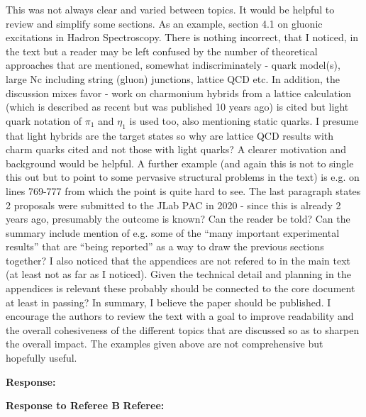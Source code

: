 \documentclass[10pt,aps,prl,amsmath,amssymb,superscriptaddress,nofootinbib,showpacs,preprintnumbers,amsfonts, notitlepage]{revtex4-2}
\begin{document}
This was not always clear and varied between topics.
It would be helpful to review and simplify some sections. As an example, section 4.1 on gluonic  excitations in Hadron Spectroscopy. There is nothing incorrect, that I noticed, in the text but a reader may be left confused by the number of theoretical approaches that are mentioned, somewhat indiscriminately - quark model(s), large Nc including string (gluon) junctions, lattice QCD etc. In addition, the discussion mixes favor  - work on charmonium hybrids from a lattice calculation (which is described as recent but was published 10 years ago) is cited but light quark notation of $\pi_1$  and  $\eta_1$ is used too, also mentioning static quarks. I presume that light hybrids are the target states so why are lattice QCD results with charm quarks cited and not those with light quarks? A clearer motivation and background would be helpful.
A further example (and again this is not to single this out but to point to some pervasive structural problems in the text) is e.g. on lines 769-777 from which the point is quite hard to see. The last paragraph states 2 proposals were submitted to the JLab PAC in 2020 - since this is already 2 years ago, presumably the outcome is known? Can the reader be told?
Can the summary include mention of e.g. some of the “many important experimental results” that are “being reported” as a way to draw the previous sections together? I also noticed that the appendices are not refered to in the main text (at least not as far as I noticed). Given the technical detail and planning in the appendices is relevant these probably should be connected to the core document at least in passing?
In summary, I believe the paper should be published. I encourage the authors to review the text with a goal to improve readability and the overall cohesiveness of the different  topics that are discussed so as to sharpen the overall impact. The examples given above are not comprehensive but hopefully useful.

\vskip 5pt 
{\bf Response: } 





\vskip 20pt 

{\bf Response to Referee B} 
\vskip 10pt 
{\bf Referee: } 
\end{document}
